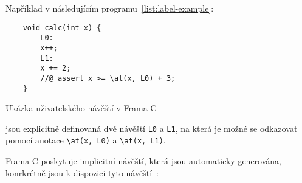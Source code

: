 Například v následujícím programu~\ref{list:label-example}:

\begin{listing}[H]
    \begin{verbatim}
    void calc(int x) {
        L0:
        x++;
        L1:
        x += 2;
        //@ assert x >= \at(x, L0) + 3;
    }
    \end{verbatim}
    \caption{Ukázka uživatelského návěští v Frama-C}
    \label{list:label-example}
\end{listing}

jsou explicitně definovaná dvě návěští \texttt{L0} a \texttt{L1},
na která je možné se odkazovat pomocí anotace \texttt{\textbackslash at(x, L0)} a \texttt{\textbackslash at(x, L1)}.

Frama\mbox{-}C poskytuje implicitní návěští, která jsou automaticky generována,
konrkrétně jsou k dispozici tyto návěští~\cite{ACSLSpec}:


